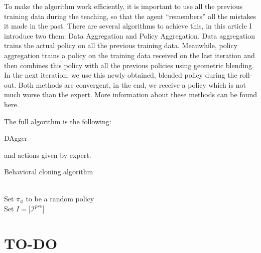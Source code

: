 \documentclass{article}
\begin{document}
To make the algorithm work efficiently, it is important to use all the previous training data during the teaching, so that the agent “remembers” all the mistakes it made in the past. There are several algorithms to achieve this, in this article I introduce two them: Data Aggregation and Policy Aggregation. Data aggregation trains the actual policy on all the previous training data. Meanwhile, policy aggregation trains a policy on the training data received on the last iteration and then combines this policy with all the previous policies using geometric blending. In the next iteration, we use this newly obtained, blended policy during the roll-out. Both methods are convergent, in the end, we receive a policy which is not much worse than the expert. More information about these methods can be found here.

The full algorithm is the following:



\begin{algorithm}
	\onehalfspacing
	\caption{DAgger} 
	\begin{algorithmic}[1]
		and actions given by expert.
		\\
		\EndFor 
	\end{algorithmic} 
\end{algorithm}

\begin{algorithm}
	\caption{Behavioral cloning algorithm}\label{algo:BC}
	\begin{algorithmic}[1]
		\\
		Set {$\pi_\phi$ to be a random policy}\\
		Set {$I = |\mathcal{I}^{pre}| $}
			
		\end{algorithmic}
	\end{algorithm}
	
	
	\section{TO-DO}
	
\end{document}
